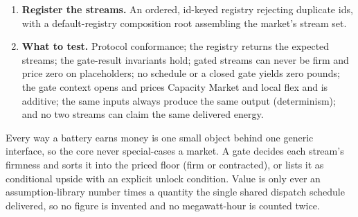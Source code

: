 \begin{rebuild}
\begin{enumerate}
  \item \textbf{Register the streams.} An ordered, id-keyed registry rejecting duplicate ids, with a default-registry composition root assembling the market's stream set.
  \item \textbf{What to test.} Protocol conformance; the registry returns the expected streams; the gate-result invariants hold; gated streams can never be firm and price zero on placeholders; no schedule or a closed gate yields zero pounds; the gate context opens and prices Capacity Market and local flex and is additive; the same inputs always produce the same output (determinism); and no two streams can claim the same delivered energy.
\end{enumerate}
\end{rebuild}

\begin{keyidea}
Every way a battery earns money is one small object behind one generic interface, so the core never special-cases a market. A gate decides each stream's firmness and sorts it into the priced floor (firm or contracted), or lists it as conditional upside with an explicit unlock condition. Value is only ever an assumption-library number times a quantity the single shared dispatch schedule delivered, so no figure is invented and no megawatt-hour is counted twice.
\end{keyidea}
